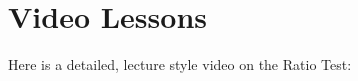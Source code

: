 \documentclass{ximera}
\begin{document}
\section{Video Lessons}

\begin{center}
\begin{foldable}
Here is a detailed, lecture style video on the Ratio Test:
\end{foldable}
\end{center}


\begin{center}
\begin{expandable}
\end{expandable}
\end{center}
\end{document}

